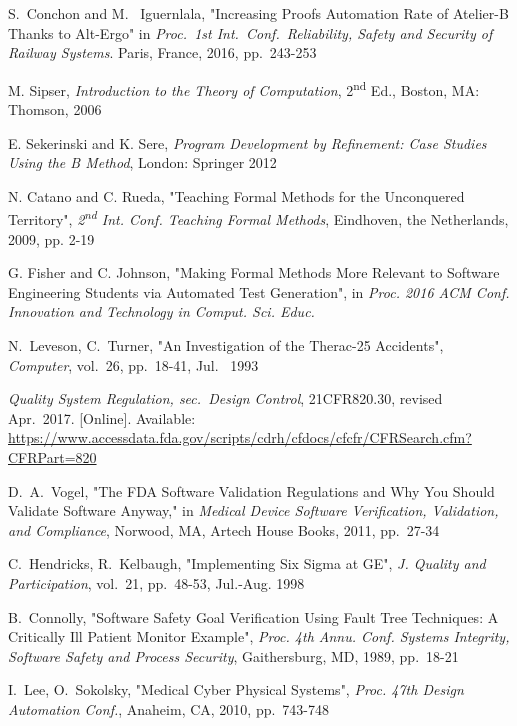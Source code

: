 \documentclass[12pt,journal,duplex]{IEEEtran}
\begin{document}
	\begin{thebibliography}{2}
		S.~Conchon and M.~ Iguernlala, "Increasing Proofs Automation Rate of Atelier-B Thanks to Alt-Ergo" in \emph{Proc.~1st Int.~Conf.~Reliability, Safety and Security of Railway Systems}. Paris, France, 2016, pp.~243-253

		M. Sipser, \emph{Introduction to the Theory of Computation}, 2\textsuperscript{nd} Ed., Boston, MA: Thomson, 2006

		E. Sekerinski and K. Sere, \emph{Program Development by Refinement: Case Studies Using the B Method}, London: Springer 2012
		
		N. Catano and C. Rueda, "Teaching Formal Methods for the Unconquered Territory", \emph{2\textsuperscript{nd} Int. Conf. Teaching Formal Methods}, Eindhoven, the Netherlands, 2009, pp. 2-19

		G. Fisher and C. Johnson, "Making Formal Methods More Relevant to Software Engineering Students via Automated Test Generation", in \emph{Proc. 2016 ACM Conf. Innovation and Technology in Comput. Sci. Educ.}

		N.~Leveson, C.~Turner, "An Investigation of the Therac-25 Accidents", \emph{Computer}, vol.~26, pp.~18-41, Jul.~ 1993

		\emph{Quality System Regulation, sec.~Design Control}, 21CFR820.30, revised Apr.~2017. [Online]. Available:
		\url{https://www.accessdata.fda.gov/scripts/cdrh/cfdocs/cfcfr/CFRSearch.cfm?CFRPart=820}

		D.~A.~Vogel, "The FDA Software Validation Regulations and Why You Should Validate Software Anyway," in \emph{Medical Device Software Verification, Validation, and Compliance}, Norwood, MA, Artech House Books, 2011, pp.~27-34

		C.~Hendricks, R.~Kelbaugh, "Implementing Six Sigma at GE", \emph{J. Quality and Participation}, vol.~21, pp.~48-53, Jul.-Aug. 1998

		B.~Connolly, "Software Safety Goal Verification Using Fault Tree Techniques: A Critically Ill Patient Monitor Example", \emph{Proc. 4th Annu. Conf. Systems Integrity, Software Safety and Process Security}, Gaithersburg, MD, 1989, pp.~18-21

		I.~Lee, O.~Sokolsky, "Medical Cyber Physical Systems", \emph{Proc. 47th Design Automation Conf.}, Anaheim, CA, 2010, pp.~743-748


\end{thebibliography}
\end{document}
